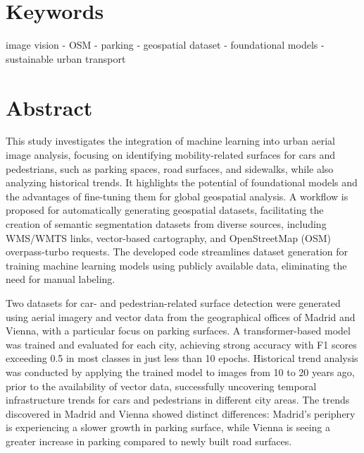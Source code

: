 \begin{refsection}
\section*{Keywords}


image vision - OSM - parking - geospatial dataset - foundational models - sustainable urban transport




\section*{Abstract}
This study investigates the integration of machine learning into urban aerial image analysis, focusing on identifying mobility-related surfaces for cars and pedestrians, such as parking spaces, road surfaces, and sidewalks, while also analyzing historical trends. It highlights the potential of foundational models and the advantages of fine-tuning them for global geospatial analysis. A workflow is proposed for automatically generating geospatial datasets, facilitating the creation of semantic segmentation datasets from diverse sources, including WMS/WMTS links, vector-based cartography, and OpenStreetMap (OSM) overpass-turbo requests. The developed code streamlines dataset generation for training machine learning models using publicly available data, eliminating the need for manual labeling.

Two datasets for car- and pedestrian-related surface detection were generated using aerial imagery and vector data from the geographical offices of Madrid and Vienna, with a particular focus on parking surfaces. A transformer-based model was trained and evaluated for each city, achieving strong accuracy with F1 scores exceeding 0.5 in most classes in just less than 10 epochs. Historical trend analysis was conducted by applying the trained model to images from 10 to 20 years ago, prior to the availability of vector data, successfully uncovering temporal infrastructure trends for cars and pedestrians in different city areas. The trends discovered in Madrid and Vienna showed distinct differences: Madrid's periphery is experiencing a slower growth in parking surface, while Vienna is seeing a greater increase in parking compared to newly built road surfaces.


\end{refsection}
